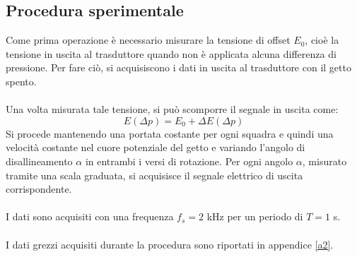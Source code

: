 \subsection{Procedura sperimentale}
Come prima operazione è necessario misurare la tensione di offset $E_0$, cioè la tensione in uscita al trasduttore quando non è applicata alcuna differenza di pressione. Per fare ciò, si acquisiscono i dati in uscita al trasduttore con il getto spento.\\\\
Una volta misurata tale tensione, si può scomporre il segnale in uscita come:
\begin{equation*}
    E(\Delta p) = E_0 + \Delta E(\Delta p)
\end{equation*}
Si procede mantenendo una portata costante per ogni squadra e quindi una velocità costante nel cuore potenziale del getto e variando l'angolo di disallineamento $\alpha$ in entrambi i versi di rotazione. Per ogni angolo $\alpha$, misurato tramite una scala graduata, si acquisisce il segnale elettrico di uscita corrispondente.\\\\
I dati sono acquisiti con una frequenza $f_s=2$ kHz per un periodo di $T=1$ s.\\\\
I dati grezzi acquisiti durante la procedura sono riportati in appendice \ref{a2}.

